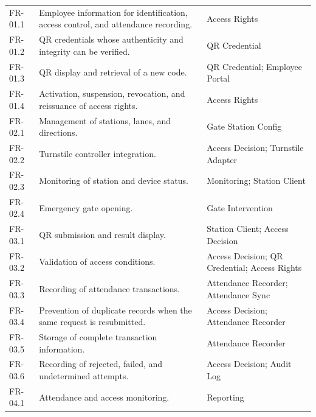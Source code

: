 \begin{longtable}{|>{\raggedright\arraybackslash}p{40.5pt}|>{\raggedright\arraybackslash}p{177.5pt}|>{\raggedright\arraybackslash}p{193.5pt}|}
\hline
\multicolumn{1}{|>{\columncolor{tableheader}\centering\arraybackslash}p{40.5pt}|}{\textbf{FR}} & \multicolumn{1}{>{\columncolor{tableheader}\centering\arraybackslash}p{177.5pt}|}{\textbf{Requirement Summary}} & \multicolumn{1}{>{\columncolor{tableheader}\centering\arraybackslash}p{193.5pt}|}{\textbf{Responsible Components}} \\
\hline
\endhead
FR-01.1 & Employee information for identification, access control, and attendance recording. & Access Rights \\
\hline
FR-01.2 & QR credentials whose authenticity and integrity can be verified. & QR Credential \\
\hline
FR-01.3 & QR display and retrieval of a new code. & QR Credential; Employee Portal \\
\hline
FR-01.4 & Activation, suspension, revocation, and reissuance of access rights. & Access Rights \\
\hline
FR-02.1 & Management of stations, lanes, and directions. & Gate Station Config \\
\hline
FR-02.2 & Turnstile controller integration. & Access Decision; Turnstile Adapter \\
\hline
FR-02.3 & Monitoring of station and device status. & Monitoring; Station Client \\
\hline
FR-02.4 & Emergency gate opening. & Gate Intervention \\
\hline
FR-03.1 & QR submission and result display. & Station Client; Access Decision \\
\hline
FR-03.2 & Validation of access conditions. & Access Decision; QR Credential; Access Rights \\
\hline
FR-03.3 & Recording of attendance transactions. & Attendance Recorder; Attendance Sync \\
\hline
FR-03.4 & Prevention of duplicate records when the same request is resubmitted. & Access Decision; Attendance Recorder \\
\hline
FR-03.5 & Storage of complete transaction information. & Attendance Recorder \\
\hline
FR-03.6 & Recording of rejected, failed, and undetermined attempts. & Access Decision; Audit Log \\
\hline
FR-04.1 & Attendance and access monitoring. & Reporting \\
\hline

\end{longtable}
